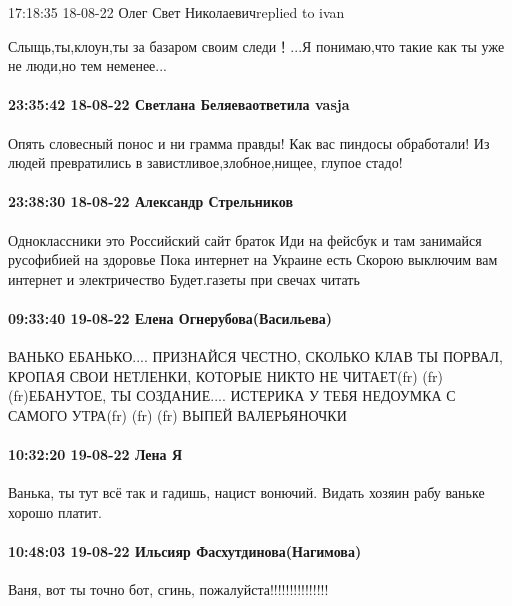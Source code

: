  
 
 
 
 

17:18:35 18-08-22
Олег Свет Николаевичreplied to ivan

Слыщь,ты,клоун,ты за базаром своим следи！...Я понимаю,что такие как ты уже не люди,но тем неменее...

\paragraph{23:35:42 18-08-22 Светлана Беляеваответила vasja}

Опять словесный понос и ни грамма правды! Как вас пиндосы обработали! Из людей
превратились в завистливое,злобное,нищее, глупое стадо!

\paragraph{23:38:30 18-08-22 Александр Стрельников}

Одноклассники это Российский сайт браток Иди на фейсбук и там занимайся
русофибией на здоровье Пока интернет на Украине есть Скорою выключим вам
интернет и электричество Будет.газеты при свечах читать

\paragraph{09:33:40 19-08-22 Елена Огнерубова(Васильева)}

ВАНЬКО ЕБАНЬКО.... ПРИЗНАЙСЯ ЧЕСТНО, СКОЛЬКО КЛАВ ТЫ ПОРВАЛ, КРОПАЯ СВОИ
НЕТЛЕНКИ, КОТОРЫЕ НИКТО НЕ ЧИТАЕТ(fr) (fr) (fr)ЕБАНУТОЕ, ТЫ СОЗДАНИЕ....
ИСТЕРИКА У ТЕБЯ НЕДОУМКА С САМОГО УТРА(fr) (fr) (fr) ВЫПЕЙ ВАЛЕРЬЯНОЧКИ

\paragraph{10:32:20 19-08-22 Лена Я}

Ванька, ты тут всё так и гадишь, нацист вонючий. Видать хозяин рабу ваньке
хорошо платит.

\paragraph{10:48:03 19-08-22 Ильсияр Фасхутдинова(Нагимова)}

Ваня, вот ты точно бот, сгинь, пожалуйста!!!!!!!!!!!!!!!
